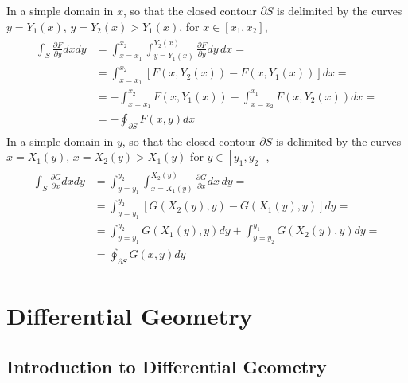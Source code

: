 \documentclass[letterpaper,10pt,english]{jupyterBook}
\begin{document}
\sphinxAtStartPar
In a simple domain in  \(x\), so that the closed contour \(\partial S\) is delimited by the curves \(y=Y_1(x)\), \(y=Y_2(x) > Y_1(x)\), for \(x \in [x_1, x_2]\),
\begin{equation*}
\begin{split}\begin{aligned}
  \int_{S} \frac{\partial F}{\partial y} dx dy 
  & =   \int_{x=x_1}^{x_2} \int_{y = Y_1(x)}^{Y_2(x)} \frac{\partial F}{\partial y} dy \, dx = \\
  & =   \int_{x=x_1}^{x_2} \left[ F(x,Y_2(x)) - F(x,Y_1(x)) \right] dx = \\
  & = - \int_{x=x_1}^{x_2} F(x,Y_1(x)) - \int_{x=x_2}^{x_1} F(x, Y_2(x)) dx = \\
  & = - \oint_{\partial S} F(x,y) dx 
\end{aligned}\end{split}
\end{equation*}
\sphinxAtStartPar
In a simple domain in  \(y\), so that the closed contour \(\partial S\) is delimited by the curves \(x=X_1(y)\), \(x=X_2(y) > X_1(y)\) for \(y \in [y_1, y_2]\),
\begin{equation*}
\begin{split}\begin{aligned}
  \int_{S} \frac{\partial G}{\partial x} dx dy 
  & = \int_{y=y_1}^{y_2} \int_{x = X_1(y)}^{X_2(y)} \frac{\partial G}{\partial x} dx \, dy = \\
  & = \int_{y=y_1}^{y_2} \left[ G(X_2(y),y) - G(X_1(y),y) \right] dy = \\
  & = \int_{y=y_1}^{y_2} G(X_1(y),y) dy + \int_{y=y_2}^{y_1} G(X_2(y),y) dy = \\
  & = \oint_{\partial S} G(x,y) dy 
\end{aligned}\end{split}
\end{equation*}
\sphinxstepscope


\part{Differential Geometry}

\sphinxstepscope


\chapter{Introduction to Differential Geometry}
\label{\detokenize{ch/differential-geometry/intro:introduction-to-differential-geometry}}\label{\detokenize{ch/differential-geometry/intro:differential-geometry-intro}}\label{\detokenize{ch/differential-geometry/intro::doc}}
\end{document}
